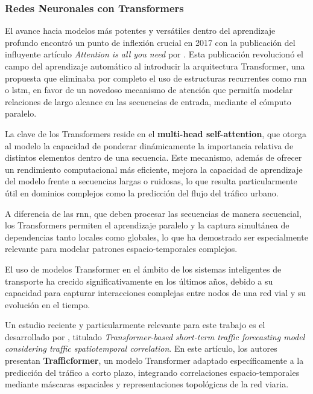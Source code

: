 \subsubsection{Redes Neuronales con Transformers}

El avance hacia modelos más potentes y versátiles dentro del aprendizaje profundo encontró un punto de inflexión crucial en 2017 con la publicación del influyente artículo \textit{Attention is all you need} por \cite{attentionIsAllYouNeed}. Esta publicación revolucionó el campo del aprendizaje automático al introducir la arquitectura Transformer, una propuesta que eliminaba por completo el uso de estructuras recurrentes como \acrshort{rnn} o \acrshort{lstm}, en favor de un novedoso mecanismo de atención que permitía modelar relaciones de largo alcance en las secuencias de entrada, mediante el cómputo paralelo.

La clave de los Transformers reside en el \textbf{multi-head self-attention}, que otorga al modelo la capacidad de ponderar dinámicamente la importancia relativa de distintos elementos dentro de una secuencia. Este mecanismo, además de ofrecer un rendimiento computacional más eficiente, mejora la capacidad de aprendizaje del modelo frente a secuencias largas o ruidosas, lo que resulta particularmente útil en dominios complejos como la predicción del flujo del tráfico urbano.

A diferencia de las \acrshort{rnn}, que deben procesar las secuencias de manera secuencial, los Transformers permiten el aprendizaje paralelo y la captura simultánea de dependencias tanto locales como globales, lo que ha demostrado ser especialmente relevante para modelar patrones espacio-temporales complejos.

\vspace{0.5cm}

El uso de modelos Transformer en el ámbito de los sistemas inteligentes de transporte ha crecido significativamente en los últimos años, debido a su capacidad para capturar interacciones complejas entre nodos de una red vial y su evolución en el tiempo.

Un estudio reciente y particularmente relevante para este trabajo es el desarrollado por \cite{trafficformer}, titulado \textit{Transformer-based short-term traffic forecasting model considering traffic spatiotemporal correlation}. En este artículo, los autores presentan \textbf{Trafficformer}, un modelo Transformer adaptado específicamente a la predicción del tráfico a corto plazo, integrando correlaciones espacio-temporales mediante máscaras espaciales y representaciones topológicas de la red viaria.

